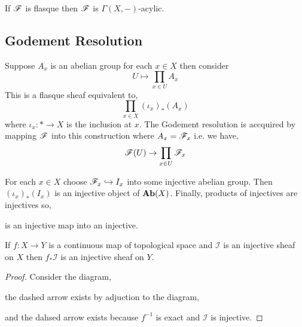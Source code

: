 \documentclass[12pt]{article}
\begin{document}
\begin{lemma}
If $\mathscr{F}$ is flasque then $\mathscr{F}$ is $\Gamma(X, - )$-acylic. 
\end{lemma}

\subsection{Godement Resolution}

Suppose $A_x$ is an abelian group for each $x \in X$ then consider
\[ U \mapsto \prod_{x \in U} A_x \]
This is a flasque sheaf equivalent to,
\[ \prod_{x \in X} (\iota_x)_*(A_x) \]
where $\iota_x : * \to X$ is the inclusion at $x$. The Godement resolution is accquired by mapping $\mathscr{F}$ into this construction where $A_x = \mathscr{F}_x$ i.e. we have,\[ \mathscr{F}(U) \to \prod_{x \in U} \mathscr{F}_x \]

\begin{theorem}
For each $x \in X$ choose $\mathscr{F}_x \hookrightarrow I_x$ into some injective abelian group. Then $(\iota_x)_*(I_x)$ is an injective object of $\mathbf{Ab}(X)$. Finally, products of injectives are injectives so,
\begin{center}
\end{center}
is an injective map into an injective. 
\end{theorem}

\begin{proposition}
If $f : X \to Y$ is a continuous map of topological space and $\mathcal{I}$ is an injective sheaf on $X$ then $f_* \mathcal{I}$ is an injective sheaf on $Y$.
\end{proposition}

\begin{proof}
Consider the diagram,
\begin{center}
\end{center}
the dashed arrow exists by adjuction to the diagram,
\begin{center}
\end{center}
and the dahsed arrow exists because $f^{-1}$ is exact and $\mathcal{I}$ is injective. 
\end{proof}
\end{document}
